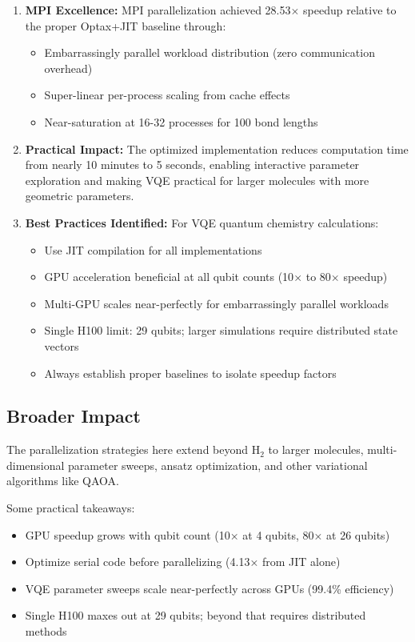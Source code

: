 \documentclass[11pt]{article}
\begin{document}
\begin{enumerate}
    \item \textbf{MPI Excellence:} MPI parallelization achieved 28.53$\times$ speedup relative to the proper Optax+JIT baseline through:
          \begin{itemize}
              \item Embarrassingly parallel workload distribution (zero communication overhead)
              \item Super-linear per-process scaling from cache effects
              \item Near-saturation at 16-32 processes for 100 bond lengths
          \end{itemize}

    \item \textbf{Practical Impact:} The optimized implementation reduces computation time from nearly 10 minutes to 5 seconds, enabling interactive parameter exploration and making VQE practical for larger molecules with more geometric parameters.

    \item \textbf{Best Practices Identified:} For VQE quantum chemistry calculations:
          \begin{itemize}
              \item Use JIT compilation for all implementations
              \item GPU acceleration beneficial at all qubit counts (10$\times$ to 80$\times$ speedup)
              \item Multi-GPU scales near-perfectly for embarrassingly parallel workloads
              \item Single H100 limit: 29 qubits; larger simulations require distributed state vectors
              \item Always establish proper baselines to isolate speedup factors
          \end{itemize}
\end{enumerate}

\subsection{Broader Impact}

The parallelization strategies here extend beyond H$_2$ to larger molecules, multi-dimensional parameter sweeps, ansatz optimization, and other variational algorithms like QAOA.

Some practical takeaways:
\begin{itemize}
    \item GPU speedup grows with qubit count (10× at 4 qubits, 80× at 26 qubits)
    \item Optimize serial code before parallelizing (4.13× from JIT alone)
    \item VQE parameter sweeps scale near-perfectly across GPUs (99.4\% efficiency)
    \item Single H100 maxes out at 29 qubits; beyond that requires distributed methods
\end{itemize}
\end{document}
